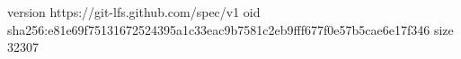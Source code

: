 version https://git-lfs.github.com/spec/v1
oid sha256:e81e69f75131672524395a1c33eac9b7581c2eb9fff677f0e57b5cae6e17f346
size 32307
